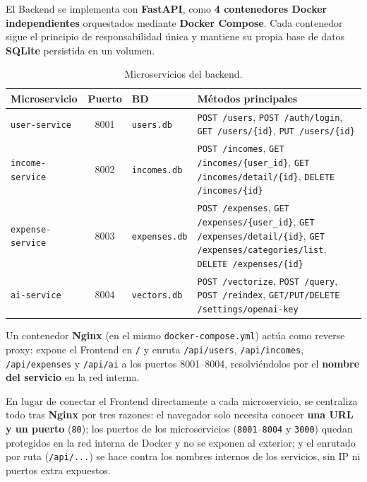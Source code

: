 \documentclass[12pt,letterpaper]{article}
\begin{document}
El Backend se implementa con \textbf{FastAPI}, como \textbf{4 contenedores Docker
independientes} orquestados mediante \textbf{Docker Compose}. Cada contenedor sigue el
principio de responsabilidad \'unica y mantiene su propia base de datos
\textbf{SQLite} persistida en un volumen.

\begin{table}[H]
\centering
\small
\begin{tabular}{l c l p{6.2cm}}
\toprule
\textbf{Microservicio} & \textbf{Puerto} & \textbf{BD} & \textbf{M\'etodos principales} \\
\midrule
\texttt{user-service} & 8001 & \texttt{users.db} & \texttt{POST /users}, \texttt{POST /auth/login}, \texttt{GET /users/\{id\}}, \texttt{PUT /users/\{id\}} \\
\texttt{income-service} & 8002 & \texttt{incomes.db} & \texttt{POST /incomes}, \texttt{GET /incomes/\{user\_id\}}, \texttt{GET /incomes/detail/\{id\}}, \texttt{DELETE /incomes/\{id\}} \\
\texttt{expense-service} & 8003 & \texttt{expenses.db} & \texttt{POST /expenses}, \texttt{GET /expenses/\{user\_id\}}, \texttt{GET /expenses/detail/\{id\}}, \texttt{GET /expenses/categories/list}, \texttt{DELETE /expenses/\{id\}} \\
\texttt{ai-service} & 8004 & \texttt{vectors.db} & \texttt{POST /vectorize}, \texttt{POST /query}, \texttt{POST /reindex}, \texttt{GET/PUT/DELETE /settings/openai-key} \\
\bottomrule
\end{tabular}
\caption{Microservicios del backend.}
\end{table}

Un contenedor \textbf{Nginx} (en el mismo \texttt{docker-compose.yml}) act\'ua como
reverse proxy: expone el Frontend en \texttt{/} y enruta \texttt{/api/users},
\texttt{/api/incomes}, \texttt{/api/expenses} y \texttt{/api/ai} a los puertos
8001--8004, resolvi\'endolos por el \textbf{nombre del servicio} en la red interna.

En lugar de conectar el Frontend directamente a cada microservicio, se centraliza todo tras
\textbf{Nginx} por tres razones: el navegador solo necesita conocer \textbf{una URL y un
puerto} (\texttt{80}); los puertos de los microservicios (\texttt{8001}--\texttt{8004} y
\texttt{3000}) quedan protegidos en la red interna de Docker y no se exponen al exterior; y
el enrutado por ruta (\texttt{/api/...}) se hace contra los nombres internos de los
servicios, sin IP ni puertos extra expuestos.
\end{document}
